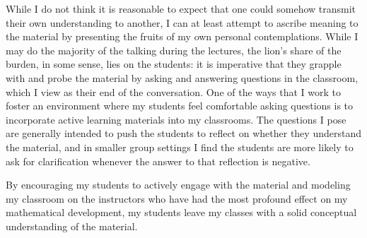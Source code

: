 \documentclass[11pt]{amsart}
\begin{document}
While I do not think it is reasonable to expect that one could somehow transmit their own understanding to another, I can at least attempt to ascribe meaning to the material by presenting the fruits of my own personal contemplations.
While I may do the majority of the talking during the lectures, the lion's share of the burden, in some sense, lies on the students: it is imperative that they grapple with and probe the material by asking and answering questions in the classroom, which I view as their end of the conversation.
One of the ways that I work to foster an environment where my students feel comfortable asking questions is to incorporate active learning materials into my classrooms.
The questions I pose are generally intended to push the students to reflect on whether they understand the material, and in smaller group settings I find the students are more likely to ask for clarification whenever the answer to that reflection is negative.


By encouraging my students to actively engage with the material and modeling my classroom on the instructors who have had the most profound effect on my mathematical development, my students leave my classes with a solid conceptual understanding of the material.
\end{document}

